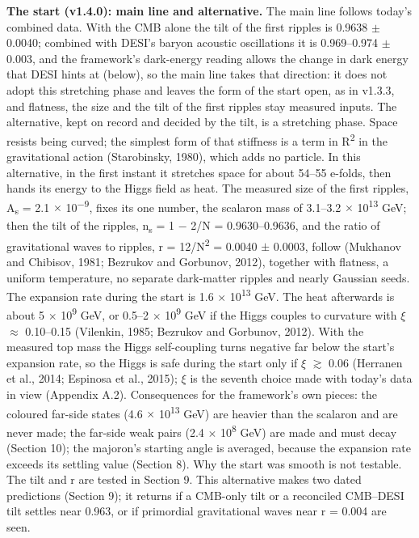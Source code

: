 \documentclass[
  11pt,
]{article}
\begin{document}
\textbf{The start (v1.4.0): main line and alternative.} The main line follows today's combined data. With the CMB alone the tilt of the first ripples is 0.9638 \ensuremath{\pm} 0.0040; combined with DESI's baryon acoustic oscillations it is 0.969--0.974 \ensuremath{\pm} 0.003, and the framework's dark-energy reading allows the change in dark energy that DESI hints at (below), so the main line takes that direction: it does not adopt this stretching phase and leaves the form of the start open, as in v1.3.3, and flatness, the size and the tilt of the first ripples stay measured inputs. The alternative, kept on record and decided by the tilt, is a stretching phase. Space resists being curved; the simplest form of that stiffness is a term in R\textsuperscript{2} in the gravitational action (Starobinsky, 1980), which adds no particle. In this alternative, in the first instant it stretches space for about 54--55 e-folds, then hands its energy to the Higgs field as heat. The measured size of the first ripples, A\textsubscript{s} = 2.1 \ensuremath{\times} 10\textsuperscript{\ensuremath{-}9}, fixes its one number, the scalaron mass of 3.1--3.2 \ensuremath{\times} 10\textsuperscript{13} GeV; then the tilt of the ripples, n\textsubscript{s} = 1 \ensuremath{-} 2/N = 0.9630--0.9636, and the ratio of gravitational waves to ripples, r = 12/N\textsuperscript{2} = 0.0040 \ensuremath{\pm} 0.0003, follow (Mukhanov and Chibisov, 1981; Bezrukov and Gorbunov, 2012), together with flatness, a uniform temperature, no separate dark-matter ripples and nearly Gaussian seeds. The expansion rate during the start is 1.6 \ensuremath{\times} 10\textsuperscript{13} GeV. The heat afterwards is about 5 \ensuremath{\times} 10\textsuperscript{9} GeV, or 0.5--2 \ensuremath{\times} 10\textsuperscript{9} GeV if the Higgs couples to curvature with \ensuremath{\xi} \ensuremath{\approx} 0.10--0.15 (Vilenkin, 1985; Bezrukov and Gorbunov, 2012). With the measured top mass the Higgs self-coupling turns negative far below the start's expansion rate, so the Higgs is safe during the start only if \ensuremath{\xi} \ensuremath{\gtrsim} 0.06 (Herranen et al., 2014; Espinosa et al., 2015); \ensuremath{\xi} is the seventh choice made with today's data in view (Appendix A.2). Consequences for the framework's own pieces: the coloured far-side states (4.6 \ensuremath{\times} 10\textsuperscript{13} GeV) are heavier than the scalaron and are never made; the far-side weak pairs (2.4 \ensuremath{\times} 10\textsuperscript{8} GeV) are made and must decay (Section 10); the majoron's starting angle is averaged, because the expansion rate exceeds its settling value (Section 8). Why the start was smooth is not testable. The tilt and r are tested in Section 9. This alternative makes two dated predictions (Section 9); it returns if a CMB-only tilt or a reconciled CMB--DESI tilt settles near 0.963, or if primordial gravitational waves near r = 0.004 are seen.
\end{document}

